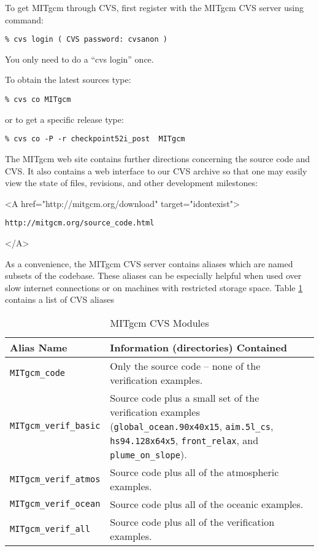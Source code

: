 To get MITgcm through CVS, first register with the MITgcm CVS server
using command:
\begin{verbatim}
% cvs login ( CVS password: cvsanon )
\end{verbatim}
You only need to do a ``cvs login'' once.

To obtain the latest sources type:
\begin{verbatim}
% cvs co MITgcm
\end{verbatim}
or to get a specific release type:
\begin{verbatim}
% cvs co -P -r checkpoint52i_post  MITgcm
\end{verbatim}
The MITgcm web site contains further directions concerning the source
code and CVS.  It also contains a web interface to our CVS archive so
that one may easily view the state of files, revisions, and other
development milestones:
\begin{rawhtml} <A href="http://mitgcm.org/download" target="idontexist"> \end{rawhtml}
\begin{verbatim}
http://mitgcm.org/source_code.html
\end{verbatim}
\begin{rawhtml} </A> \end{rawhtml}

As a convenience, the MITgcm CVS server contains aliases which are
named subsets of the codebase.  These aliases can be especially
helpful when used over slow internet connections or on machines with
restricted storage space.  Table \ref{tab:cvsModules} contains a list
of CVS aliases
\begin{table}[htb]
  \centering
  \begin{tabular}[htb]{|lp{3.25in}|}\hline
    \textbf{Alias Name}    &  \textbf{Information (directories) Contained}  \\\hline
    \texttt{MITgcm\_code}  &  Only the source code -- none of the verification examples.  \\
    \texttt{MITgcm\_verif\_basic}
    &  Source code plus a small set of the verification examples 
    (\texttt{global\_ocean.90x40x15}, \texttt{aim.5l\_cs}, \texttt{hs94.128x64x5}, 
    \texttt{front\_relax}, and \texttt{plume\_on\_slope}).  \\
    \texttt{MITgcm\_verif\_atmos}  &  Source code plus all of the atmospheric examples.  \\
    \texttt{MITgcm\_verif\_ocean}  &  Source code plus all of the oceanic examples.  \\
    \texttt{MITgcm\_verif\_all}    &  Source code plus all of the
    verification examples. \\\hline
  \end{tabular}
  \caption{MITgcm CVS Modules}
  \label{tab:cvsModules}
\end{table}

